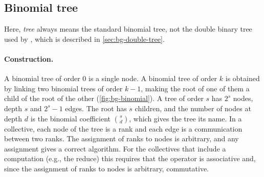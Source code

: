 \subsection{Binomial tree}\label{sec:bg-tree}

Here, \emph{tree} always means the standard binomial tree, not the double binary tree used by \nccl{}, which is described in \cref{sec:bg-double-tree}.

\paragraph{Construction.}
A binomial tree of order $0$ is a single node.
A binomial tree of order $k$ is obtained by linking two binomial trees of order $k-1$, making the root of one of them a child of the root of the other (\cref{fig:bg-binomial}).
A tree of order $s$ has $2^s$ nodes, depth $s$ and $2^s-1$ edges. The root has $s$ children, and the number of nodes at depth $d$ is the binomial coefficient $\binom{s}{d}$, which gives the tree its name.
In a collective, each node of the tree is a rank and each edge is a communication between two ranks.
The assignment of ranks to nodes is arbitrary, and any assignment gives a correct algorithm.
For the collectives that include a computation (e.g., the reduce) this requires that the operator is associative and, since the assignment of ranks to nodes is arbitrary, commutative.

